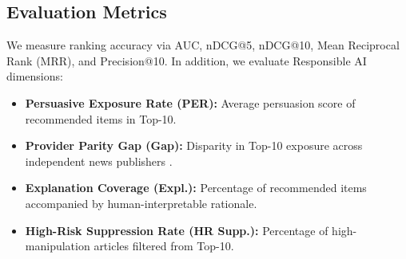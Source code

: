 \documentclass[conference]{IEEEtran}
\begin{document}
\subsection{Evaluation Metrics}
We measure ranking accuracy via AUC, nDCG@5, nDCG@10, Mean Reciprocal Rank (MRR), and Precision@10. In addition, we evaluate Responsible AI dimensions:
\begin{itemize}
    \item \textbf{Persuasive Exposure Rate (PER):} Average persuasion score of recommended items in Top-10.
    \item \textbf{Provider Parity Gap (Gap):} Disparity in Top-10 exposure across independent news publishers \cite{li_profai}.
    \item \textbf{Explanation Coverage (Expl.):} Percentage of recommended items accompanied by human-interpretable rationale.
    \item \textbf{High-Risk Suppression Rate (HR Supp.):} Percentage of high-manipulation articles filtered from Top-10.
\end{itemize}
\end{document}
